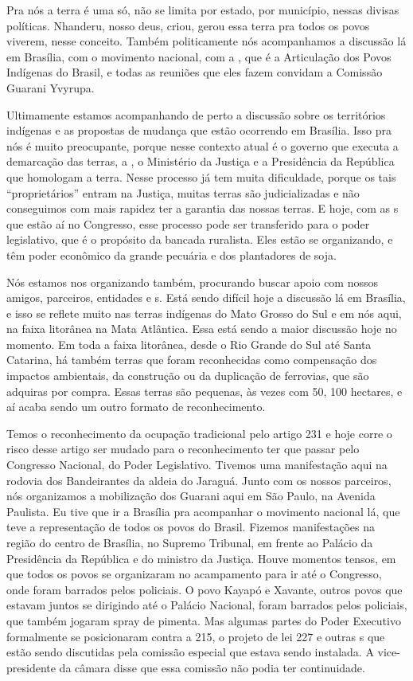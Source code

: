 Pra nós a terra é uma só, não se limita por estado, por município,
nessas divisas políticas. Nhanderu, nosso deus, criou, gerou essa terra
pra todos os povos viverem, nesse conceito. Também politicamente nós
acompanhamos a discussão lá em Brasília, com o movimento nacional, com
a , que é a Articulação dos Povos Indígenas do Brasil, e todas as
reuniões que eles fazem convidam a Comissão Guarani Yvyrupa.

Ultimamente estamos acompanhando de perto a discussão sobre os
territórios indígenas e as propostas de mudança que estão ocorrendo em
Brasília. Isso pra nós é muito preocupante, porque nesse contexto atual
é o governo que executa a demarcação das terras, a , o Ministério
da Justiça e a Presidência da República que homologam a terra. Nesse
processo já tem muita dificuldade, porque os tais ``proprietários''
entram na Justiça, muitas terras são judicializadas e não conseguimos
com mais rapidez ter a garantia das nossas terras. E hoje, com as s
que estão aí no Congresso, esse processo pode ser transferido para o
poder legislativo, que é o propósito da bancada ruralista. Eles estão
se organizando, e têm poder econômico da grande pecuária e dos
plantadores de soja. 

Nós estamos nos organizando também, procurando buscar apoio com nossos
amigos, parceiros, entidades e s. Está sendo difícil hoje a
discussão lá em Brasília, e isso se reflete muito nas terras indígenas
do Mato Grosso do Sul e em nós aqui, na faixa litorânea na Mata Atlântica.
Essa está sendo a maior discussão hoje no momento. Em toda a faixa
litorânea, desde o Rio Grande do Sul até Santa Catarina, há também
terras que foram reconhecidas como compensação dos impactos ambientais,
da construção ou da duplicação de ferrovias, que são adquiras por
compra. Essas terras são pequenas, às vezes com 50, 100 hectares, e aí
acaba sendo um outro formato de reconhecimento.

Temos o reconhecimento da ocupação tradicional pelo artigo 231 e hoje
corre o risco desse artigo ser mudado para o reconhecimento ter que
passar pelo Congresso Nacional, do Poder Legislativo. Tivemos uma
manifestação aqui na rodovia dos Bandeirantes da aldeia do Jaraguá.
Junto com os nossos parceiros, nós organizamos a mobilização dos
Guarani aqui em São Paulo, na Avenida Paulista. Eu tive que ir a
Brasília pra acompanhar o movimento nacional lá, que teve a
representação de todos os povos do Brasil. Fizemos manifestações na
região do centro de Brasília, no Supremo Tribunal, em frente ao Palácio
da Presidência da República e do ministro da Justiça. Houve momentos
tensos, em que todos os povos se organizaram no acampamento para ir até
o Congresso, onde foram barrados pelos policiais. O povo Kayapó e
Xavante, outros povos que estavam juntos se dirigindo até o Palácio
Nacional, foram barrados pelos policiais, que também jogaram spray de
pimenta. Mas algumas partes do Poder Executivo formalmente se
posicionaram contra a  215, o projeto de lei 227 e outras s que
estão sendo discutidas pela comissão especial que estava sendo
instalada. A vice-presidente da câmara disse que essa comissão não
podia ter continuidade.

